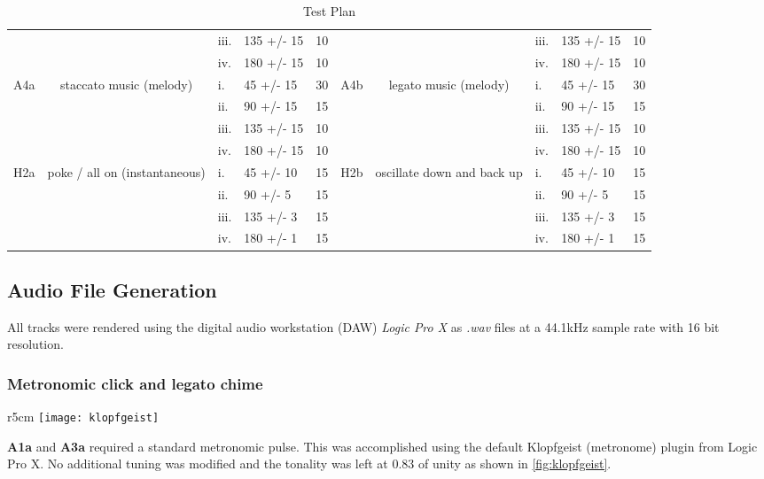\begin{table}[]
{\begin{tabular}{cclllcclll}
     &  & iii. & 135 +/- 15 & 10 &  &  & iii. & 135 +/- 15 & 10 \\
     &  & iv. & 180 +/- 15 & 10 &  &  & iv. & 180 +/- 15 & 10 \\
    \multirow{4}{*}{A4a} & \multirow{4}{*}{staccato music (melody)} & i. & 45 +/- 15 & 30 & \multirow{4}{*}{A4b} & \multirow{4}{*}{legato music (melody)} & i. & 45 +/- 15 & 30 \\
     &  & ii. & 90 +/- 15 & 15 &  &  & ii. & 90 +/- 15 & 15 \\
     &  & iii. & 135 +/- 15 & 10 &  &  & iii. & 135 +/- 15 & 10 \\
     &  & iv. & 180 +/- 15 & 10 &  &  & iv. & 180 +/- 15 & 10 \\
    \multirow{4}{*}{H2a} & \multirow{4}{*}{poke / all on (instantaneous)} & i. & 45 +/- 10 & 15 & \multirow{4}{*}{H2b} & \multirow{4}{*}{oscillate down and back up} & i. & 45 +/- 10 & 15 \\
     &  & ii. & 90 +/- 5 & 15 &  &  & ii. & 90 +/- 5 & 15 \\
     &  & iii. & 135 +/- 3 & 15 &  &  & iii. & 135 +/- 3 & 15 \\
     &  & iv. & 180 +/- 1 & 15 &  &  & iv. & 180 +/- 1 & 15
    \end{tabular}%
    }
    \caption{Test Plan}
    \label{fig:TestPlan}
\end{table}

\subsection{Audio File Generation}
All tracks were rendered using the digital audio workstation (DAW) \textit{Logic Pro X} as \textit{.wav} files at a 44.1kHz sample rate with 16 bit resolution.
\subsubsection{Metronomic click and legato chime}
\begin{wrapfigure}{r}{5cm}
    \centering
    \texttt{[image: klopfgeist]}
    \caption{Default metronome}
    \label{fig:klopfgeist}
\end{wrapfigure}
\textbf{A1a} and \textbf{A3a} required a standard metronomic pulse. This was accomplished using the default Klopfgeist (metronome) plugin from Logic Pro X. No additional tuning was modified and the tonality was left at 0.83 of unity as shown in \ref{fig:klopfgeist}. 


